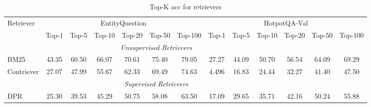 \begin{table*}[!ht]
\addtolength{\tabcolsep}{-0.65pt}
\small
\centering
\begin{tabular}{@{}l | c c c c c c | c c c c c c@{}}\toprule
Retriever & \multicolumn{6}{c}{EntityQuestion} & \multicolumn{6}{c}{HotpotQA-Val}  \\

& Top-1 & Top-5 &Top-10 & Top-20 &Top-50 & Top-100 & Top-1 & Top-5 &Top-10 & Top-20 &Top-50 & Top-100  \\
\midrule
\multicolumn{11}{c}{\textit{Unsupervised Retrievers}} \\
\midrule
BM25        &  43.35 & 60.50 & 66.07  & 70.61  & 75.40  &  79.05   & 27.27  & 44.09 &  50.70 & 56.54 & 64.09 & 69.29\\



Contriever &27.07 &47.99 &55.67 & 62.33 & 69.49 & 74.63 & 4.496  & 16.83 & 24.44  & 32.27 &41.40& 47.50 \\



\midrule
\multicolumn{11}{c}{\textit{Supervised Retrievers}} \\
\midrule
DPR     & 25.30  & 39.53  & 45.29  & 50.75  &  58.08 &  63.50   & 17.09  & 29.65 &  35.71 &42.16   &50.24 & 55.88\\


\midrule
\end{tabular}
\caption{ Top-K acc for retrievers
}
\label{tab:qa4}
\end{table*}